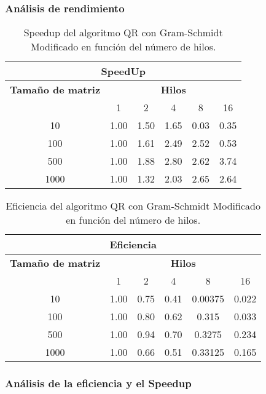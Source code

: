 \documentclass{article}
\begin{document}
\subsubsection{Análisis de rendimiento}

\begin{table}[H]
\centering
\label{tab:speedup}
\begin{tabular}{|c|c|c|c|c|c|}
\hline
\multicolumn{6}{|c|}{\textbf{SpeedUp}} \\
\hline
\multicolumn{1}{|c|}{\textbf{Tamaño de matriz}} & \multicolumn{5}{c|}{\textbf{Hilos}} \\ \hline
 & 1 & 2 & 4 & 8 & 16 \\ \hline
10   & 1.00  & 1.50  & 1.65  & 0.03  & 0.35 \\ \hline
100  & 1.00  & 1.61  & 2.49  & 2.52  & 0.53 \\ \hline
500  & 1.00  & 1.88  & 2.80  & 2.62  & 3.74 \\ \hline
1000 & 1.00  & 1.32  & 2.03  & 2.65  & 2.64 \\ \hline
\end{tabular}
\caption{Speedup del algoritmo QR con Gram-Schmidt Modificado en función del número de hilos.}
\end{table}


\begin{table}[H]
\centering
\label{tab:efficiency}
\begin{tabular}{|c|c|c|c|c|c|}
\hline
\multicolumn{6}{|c|}{\textbf{Eficiencia}} \\
\hline
\multicolumn{1}{|c|}{\textbf{Tamaño de matriz}} & \multicolumn{5}{c|}{\textbf{Hilos}} \\ \hline
 & 1 & 2 & 4 & 8 & 16 \\ \hline
10   & 1.00  & 0.75  & 0.41  & 0.00375  & 0.022 \\ \hline
100  & 1.00  & 0.80  & 0.62  & 0.315    & 0.033 \\ \hline
500  & 1.00  & 0.94  & 0.70  & 0.3275   & 0.234 \\ \hline
1000 & 1.00  & 0.66  & 0.51  & 0.33125  & 0.165 \\ \hline
\end{tabular}
\caption{Eficiencia del algoritmo QR con Gram-Schmidt Modificado en función del número de hilos.}
\end{table}

\subsubsection{Análisis de la eficiencia y el Speedup}
\end{document}
